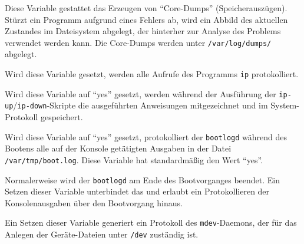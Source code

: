 \begin{description}


  Diese Variable gestattet das Erzeugen von "`Core-Dumps"' (Speicherauszügen).
  Stürzt ein Programm aufgrund eines Fehlers ab, wird ein Abbild des aktuellen
  Zustandes im Dateisystem abgelegt, der hinterher zur Analyse des
  Problems verwendet werden kann. Die Core-Dumps werden unter
  \texttt{/var/log/dumps/} abgelegt.


  Wird diese Variable gesetzt, werden alle Aufrufe des Programms \texttt{ip}
  protokolliert.


  Wird diese Variable auf "`yes"' gesetzt, werden während der
  Ausführung der \texttt{ip-up}/\texttt{ip-down}-Skripte die ausgeführten
  Anweisungen mitgezeichnet und im System-Protokoll gespeichert.


  Wird diese Variable auf "`yes"' gesetzt, protokolliert der \texttt{bootlogd}
  während des Bootens alle auf der Konsole getätigten Ausgaben in der Datei
  \texttt{/var/tmp/boot.log}. Diese Variable hat standardmäßig den Wert "`yes"'.


  Normalerweise wird der \texttt{bootlogd} am Ende des Bootvorganges
  beendet. Ein Setzen dieser Variable unterbindet das und erlaubt ein
  Protokollieren der Konsolenausgaben über den Bootvorgang hinaus.


  Ein Setzen dieser Variable generiert ein Protokoll des \texttt{mdev}-Daemons,
  der für das Anlegen der Geräte-Dateien unter \texttt{/dev} zuständig ist.

\end{description}
